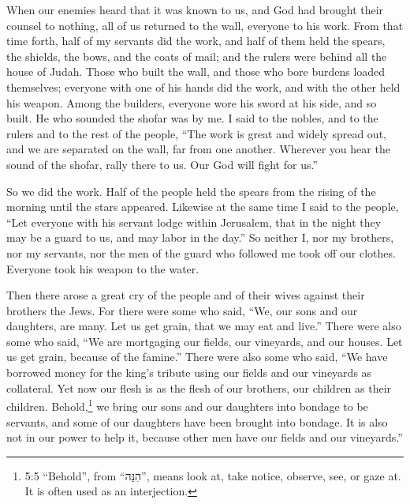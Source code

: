 \myverse{}When our enemies heard that it was known to us, and God had brought
their counsel to nothing, all of us returned to the wall, everyone to his work.
\myverse{}From that time forth, half of my servants did the work, and half of them held
the spears, the shields, the bows, and the coats of mail; and the rulers were behind all the house of
Judah.
\myverse{}Those who built the wall, and those who bore burdens loaded themselves; everyone
with one of his hands did the work, and with the other held his weapon.
\myverse{}Among the builders, everyone wore his sword at his side, and so built. He
who sounded the shofar was by me.
\myverse{}I said to the nobles, and to the rulers and to the rest of the people, “The
work is great and widely spread out, and we are separated on the wall, far from one another.
\myverse{}Wherever you hear the sound of the shofar, rally there to us. Our God will
fight for us.”

\myverse{}So we did the work. Half of the people held the spears from the
rising of the morning until the stars appeared.
\myverse{}Likewise at the same time I said to the people, “Let everyone with his servant
lodge within Jerusalem, that in the night they may be a guard to us, and may labor in the day.”
\myverse{}So neither I, nor my brothers, nor my servants, nor the men of the guard who
followed me took off our clothes. Everyone took his weapon to the water.


\mychapter{} \myverse*{}Then there arose a great cry of the people and of their wives against
their brothers the Jews.
\myverse{}For there were some who said, “We, our sons and our daughters, are many. Let
us get grain, that we may eat and live.”
\myverse{}There were also some who said, “We are mortgaging our fields, our vineyards,
and our houses. Let us get grain, because of the famine.”
\myverse{}There were also some who said, “We have borrowed money for the king’s tribute
using our fields and our vineyards as collateral.
\myverse{}Yet now our flesh is as the flesh of our brothers, our children as their children.
Behold,\footnote{5:5 “Behold”, from “הִנֵּה”, means look at, take notice, observe, see, or gaze at. It is
	often used as an interjection.} we bring our sons and our daughters into bondage to be servants,
and some of our daughters have been brought into bondage. It is also not in our power to help it, because
other men have our fields and our vineyards.”

